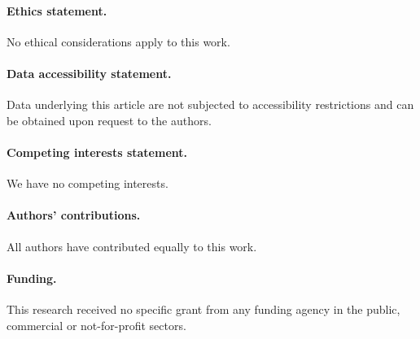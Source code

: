 \documentclass[oneside]{article}
\begin{document}
			\begin{footnotesize}
				
				\paragraph*{Ethics statement.} No ethical considerations apply to this work.\vspace{-0.2cm}
				
				\paragraph*{Data accessibility statement.}
				Data underlying this article are not subjected to accessibility restrictions and can be obtained upon request to the authors.\vspace{-0.2cm}
				
				\paragraph*{Competing interests statement.} We have no competing interests.\vspace{-0.2cm}
				
				\paragraph*{Authors' contributions.} All authors have contributed equally to this work.\vspace{-0.2cm}
				
				\paragraph*{Funding.} This research received no specific grant from any funding agency in the public, commercial or not-for-profit sectors.
				
			\end{footnotesize}
			
			
\end{document}
